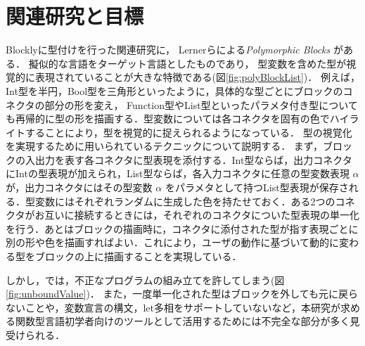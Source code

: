 \chapter{関連研究と目標}\label{chap:senko}

Blocklyに型付けを行った関連研究に，
Lernerらによる{\it Polymorphic Blocks} \cite{Typed-Blockly}がある．
擬似的な言語をターゲット言語としたものであり，
型変数を含めた型が視覚的に表現されていることが大きな特徴である(図\ref{fig:polyBlockList})．
例えば，Int型を半円，Bool型を三角形といったように，具体的な型ごとにブロックのコネクタの部分の形を変え，
Function型やList型といったパラメタ付き型についても再帰的に型の形を描画する．型変数については各コネクタを固有の色でハイライトすることにより，型を視覚的に捉えられるようになっている．
型の視覚化を実現するために用いられているテクニックについて説明する．
まず，ブロックの入出力を表す各コネクタに型表現を添付する．Int型ならば，出力コネクタにIntの型表現が加えられ，List型ならば，各入力コネクタに任意の型変数表現 $\alpha$ が，出力コネクタにはその型変数 $\alpha$ をパラメタとして持つList型表現が保存される．型変数にはそれぞれランダムに生成した色を持たせておく．ある2つのコネクタがお互いに接続するときには，それぞれのコネクタについた型表現の単一化を行う．あとはブロックの描画時に，コネクタに添付された型が指す表現ごとに別の形や色を描画すればよい．これにより，ユーザの動作に基づいて動的に変わる型をブロックの上に描画することを実現している．

しかし，\cite{Typed-Blockly}では，不正なプログラムの組み立てを許してしまう(図\ref{fig:unboundValue})．
また，一度単一化された型はブロックを外しても元に戻らないことや，変数宣言の構文，let多相\cite{AkaHon}をサポートしていないなど，本研究が求める関数型言語初学者向けのツールとして活用するためには不完全な部分が多く見受けられる．

